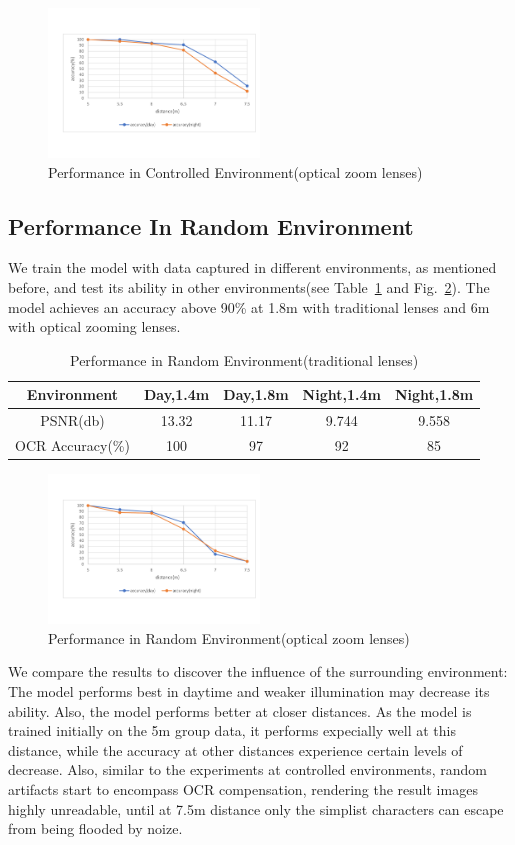 \begin{figure}
 \centering
    \includegraphics[width=0.5\textwidth]{./pic/distance.pdf}
    \caption{Performance in Controlled Environment(optical zoom lenses)}
    \label{fig-control}
\end{figure}
\subsection{Performance In Random Environment}
We train the model with data captured in different environments, as mentioned before, and test its ability in other environments(see Table~\ref{table-random} and Fig.~\ref{fig-random}). The model achieves an accuracy above 90\% at 1.8m with traditional lenses and 6m with optical zooming lenses. 

\begin{table}  
\begin{tabular}{c|c|c|c|c} 
Environment & Day,1.4m & Day,1.8m & Night,1.4m & Night,1.8m \\ \hline
PSNR(db) & 13.32 & 11.17 & 9.744 & 9.558 \\ \hline
OCR Accuracy(\%) & 100 & 97 & 92 & 85 \\
\end{tabular} 
\caption{Performance in Random Environment(traditional lenses)}
\label{table-random}
\end{table}

\begin{figure}
 \centering
    \includegraphics[width=0.5\textwidth]{./pic/distance2.pdf}
    \caption{Performance in Random Environment(optical zoom lenses)}
    \label{fig-random}
\end{figure}
We compare the results to discover the influence of the surrounding environment: The model performs best in daytime and weaker illumination may decrease its ability. Also, the model performs better at closer distances. As the model is trained initially on the 5m group data, it performs expecially well at this distance, while the accuracy at other distances experience certain levels of decrease. Also, similar to the experiments at controlled environments, random artifacts start to encompass OCR compensation, rendering the result images highly unreadable, until at 7.5m distance only the simplist characters can escape from being flooded by noize.

